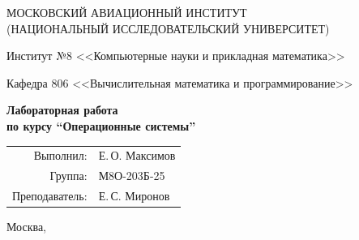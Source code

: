 \begin{titlepage}
\begin{center}
\large
МОСКОВСКИЙ АВИАЦИОННЫЙ ИНСТИТУТ\\ (НАЦИОНАЛЬНЫЙ ИССЛЕДОВАТЕЛЬСКИЙ УНИВЕРСИТЕТ)

\vspace{20pt}

Институт №8 <<Компьютерные науки и прикладная математика>>

Кафедра 806 <<Вычислительная математика и программирование>>
\end{center}

\vspace{60pt}

\begin{center}
\bfseries
\large
Лабораторная работа  \\по курсу \enquote{Операционные системы}

\vspace{54pt}

\end{center}

\vfill

\begin{flushright}
\large
\begin{tabular}{rl}
Выполнил: & Е.\,О. Максимов \\
Группа: & М8О-203Б-25 \\
Преподаватель: & Е.\,С. Миронов \\
\end{tabular}
\end{flushright}

\vspace{92pt}

\begin{center}
\large
Москва, \the\year
\end{center}
\end{titlepage}

\pagebreak
